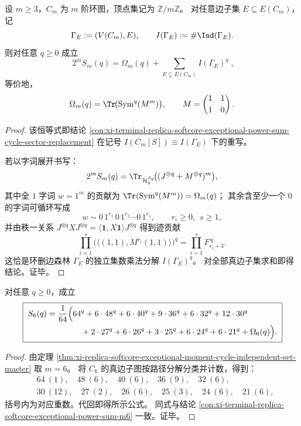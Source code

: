 \begin{theorem}[例外谱矩的环子图独立集分解总公式]\label{thm:xi-replica-softcore-exceptional-moment-cycle-independent-set-master}
设 \(m\ge 3\)，\(C_m\) 为 \(m\) 阶环图，顶点集记为 \(\mathbb Z/m\mathbb Z\)。
对任意边子集 \(E\subseteq E(C_m)\)，记
\[
\Gamma_E:=(V(C_m),E),\qquad I(\Gamma_E):=\#\Ind(\Gamma_E).
\]
则对任意 \(q\ge 0\) 成立
\[
\boxed{\;
2^mS_m(q)=\Omega_m(q)+\sum_{E\subsetneq E(C_m)} I(\Gamma_E)^q\; } ,
\]
等价地，
\[
\Omega_m(q)=\Tr\!\bigl(\mathrm{Sym}^q(M^m)\bigr),\qquad
M=\begin{pmatrix}1&1\\[2pt]1&0\end{pmatrix}.
\]
\end{theorem}
\begin{proof}
该恒等式即结论
\ref{con:xi-terminal-replica-softcore-exceptional-power-sum-cycle-sector-replacement}
在记号 \(I(C_m[S])\equiv I(\Gamma_E)\) 下的重写。

若以字词展开书写：
\[
2^mS_m(q)=\Tr_{\mathcal H_q^{S_q}}\!\bigl((J^{\otimes q}+M^{\otimes q})^m\bigr),
\]
其中全 \(1\) 字词 \(w=1^m\) 的贡献为
\(
\Tr(\mathrm{Sym}^q(M^m))=\Omega_m(q)
\)；
其余含至少一个 \(0\) 的字词可循环写成
\[
w\sim 0\,1^{r_1}\,0\,1^{r_2}\cdots 0\,1^{r_s},
\qquad r_i\ge0,\ \ s\ge1,
\]
并由秩一关系
\(
J^{\otimes q}XJ^{\otimes q}=\langle\mathbf1,X\mathbf1\rangle J^{\otimes q}
\)
得到迹贡献
\[
\prod_{i=1}^{s}\bigl(\langle(1,1),M^{r_i}(1,1)\rangle\bigr)^q
=\prod_{i=1}^{s}F_{r_i+3}^{\,q}.
\]
这恰是环删边森林 \(\Gamma_E\) 的独立集数乘法分解 \(I(\Gamma_E)^q\)。
对全部真边子集求和即得结论。证毕。
\end{proof}

\begin{corollary}[六次幂和的完全闭式]\label{cor:xi-replica-softcore-exceptional-power-sum-m6-complete-closed}
对任意 \(q\ge 0\)，成立
\[
\boxed{\;
\begin{aligned}
S_6(q)=\frac1{64}\Bigl(
&64^q+6\cdot 48^q+6\cdot 40^q+9\cdot 36^q+6\cdot 32^q+12\cdot 30^q\\
&\quad+2\cdot 27^q+6\cdot 26^q+3\cdot 25^q+6\cdot 24^q+6\cdot 21^q+\Omega_6(q)
\Bigr).
\end{aligned}
\;}
\]
\end{corollary}
\begin{proof}
由定理 \ref{thm:xi-replica-softcore-exceptional-moment-cycle-independent-set-master} 取 \(m=6\)。
将 \(C_6\) 的真边子图按路径分解分类并计数，得到：
\[
\begin{aligned}
&64\ (1),\quad 48\ (6),\quad 40\ (6),\quad 36\ (9),\quad 32\ (6),\\
&30\ (12),\quad 27\ (2),\quad 26\ (6),\quad 25\ (3),\quad 24\ (6),\quad 21\ (6),
\end{aligned}
\]
括号内为对应重数。代回即得所示公式。
同式与结论 \ref{con:xi-terminal-replica-softcore-exceptional-power-sum-m6} 一致。证毕。
\end{proof}

